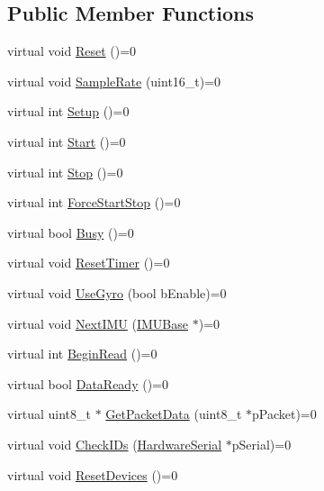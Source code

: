 \subsection*{Public Member Functions}
\begin{DoxyCompactItemize}
\item 
virtual void \hyperlink{class_i_m_u_base_a27fdd96992dfa8867943407fc400d071}{Reset} ()=0
\item 
virtual void \hyperlink{class_i_m_u_base_ad4f6b6562edc0e2b76591d0deca191d7}{SampleRate} (uint16\_\-t)=0
\item 
virtual int \hyperlink{class_i_m_u_base_a74d84beba0da335f49aa7ce94612cf13}{Setup} ()=0
\item 
virtual int \hyperlink{class_i_m_u_base_af31c2ed51cd36cc3230ebbb58757784a}{Start} ()=0
\item 
virtual int \hyperlink{class_i_m_u_base_a5b136166ec3849cbc1f93a13367eb08d}{Stop} ()=0
\item 
virtual int \hyperlink{class_i_m_u_base_a60bf7f5f9728d11bae5ca64bc7a9c10b}{ForceStartStop} ()=0
\item 
virtual bool \hyperlink{class_i_m_u_base_adb8539af8660d291fdde1f38b3d644f3}{Busy} ()=0
\item 
virtual void \hyperlink{class_i_m_u_base_a6e65b709e0212f95299ce9fa464b4651}{ResetTimer} ()=0
\item 
virtual void \hyperlink{class_i_m_u_base_a9b4cc325e9858a8bb204733dc7906ec2}{UseGyro} (bool bEnable)=0
\item 
virtual void \hyperlink{class_i_m_u_base_aa9c09bfd70f81b4a2df20cc5ae1474c3}{NextIMU} (\hyperlink{class_i_m_u_base}{IMUBase} $\ast$)=0
\item 
virtual int \hyperlink{class_i_m_u_base_a55327f28a0ad5e54d94f0c698b04827a}{BeginRead} ()=0
\item 
virtual bool \hyperlink{class_i_m_u_base_a53d56fa29c66935306e1dcca140aa9ff}{DataReady} ()=0
\item 
virtual uint8\_\-t $\ast$ \hyperlink{class_i_m_u_base_a13cf0868e2c3c31838fe889315ccfb0c}{GetPacketData} (uint8\_\-t $\ast$pPacket)=0
\item 
virtual void \hyperlink{class_i_m_u_base_ab920218bb6630f9e91ef7d0f07599203}{CheckIDs} (\hyperlink{class_hardware_serial}{HardwareSerial} $\ast$pSerial)=0
\item 
virtual void \hyperlink{class_i_m_u_base_a78622fbfb40a5bbee5e83bb8a0780d04}{ResetDevices} ()=0
\end{DoxyCompactItemize}


